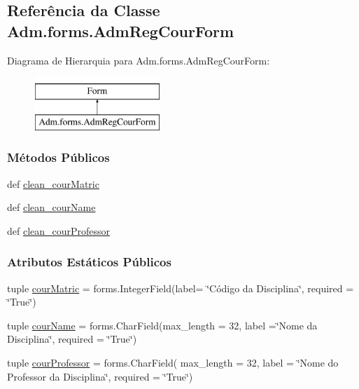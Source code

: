 \hypertarget{classAdm_1_1forms_1_1AdmRegCourForm}{\subsection{Referência da Classe Adm.\-forms.\-Adm\-Reg\-Cour\-Form}
\label{classAdm_1_1forms_1_1AdmRegCourForm}
}
Diagrama de Hierarquia para Adm.\-forms.\-Adm\-Reg\-Cour\-Form\-:\begin{figure}[H]
\begin{center}
\leavevmode
\includegraphics[height=2.000000cm]{df/d14/classAdm_1_1forms_1_1AdmRegCourForm}
\end{center}
\end{figure}
\subsubsection*{Métodos Públicos}
\begin{DoxyCompactItemize}
\item 
def \hyperlink{classAdm_1_1forms_1_1AdmRegCourForm_a9f46a4ae30627a99585378bb8cf7931f}{clean\-\_\-cour\-Matric}
\item 
def \hyperlink{classAdm_1_1forms_1_1AdmRegCourForm_a44ddd3e1d929aeb8f8ba24392ff913db}{clean\-\_\-cour\-Name}
\item 
def \hyperlink{classAdm_1_1forms_1_1AdmRegCourForm_ad8ef9f5e19392d2f1d3688ca0db794e2}{clean\-\_\-cour\-Professor}
\end{DoxyCompactItemize}
\subsubsection*{Atributos Estáticos Públicos}
\begin{DoxyCompactItemize}
\item 
tuple \hyperlink{classAdm_1_1forms_1_1AdmRegCourForm_a5030e7e3ac46b325e10adc6d39ea9736}{cour\-Matric} = forms.\-Integer\-Field(label= \char`\"{}Código da Disciplina\char`\"{}, required = \char`\"{}True\char`\"{})
\item 
tuple \hyperlink{classAdm_1_1forms_1_1AdmRegCourForm_afc325feb749069ea57387630cc0acc5a}{cour\-Name} = forms.\-Char\-Field(max\-\_\-length = 32, label =\char`\"{}Nome da Disciplina\char`\"{}, required = \char`\"{}True\char`\"{})
\item 
tuple \hyperlink{classAdm_1_1forms_1_1AdmRegCourForm_a6fcfad36a149364899dc7c95f239691f}{cour\-Professor} = forms.\-Char\-Field( max\-\_\-length = 32, label = \char`\"{}Nome do Professor da Disciplina\char`\"{}, required = \char`\"{}True\char`\"{})
\end{DoxyCompactItemize}


